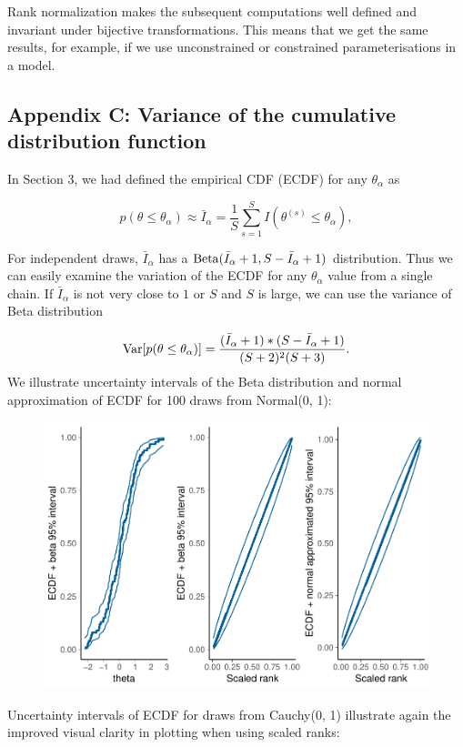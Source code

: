 \documentclass[american,]{article}
\begin{document}
Rank normalization makes the subsequent computations well defined and
invariant under bijective transformations. This means that we get the
same results, for example, if we use unconstrained or constrained
parameterisations in a model.

\hypertarget{AppendixC}{%
\subsection*{Appendix C: Variance of the cumulative distribution
function}\label{AppendixC}}

In Section 3, we had defined the empirical CDF (ECDF) for any
\(\theta_\alpha\) as

\[
p(\theta \leq \theta_\alpha) \approx \bar{I}_\alpha = \frac{1}{S}\sum_{s=1}^S
I(\theta^{(s)} \leq\theta_\alpha),
\]

For independent draws, \(\bar{I}_\alpha\) has a
\({\rm Beta}(\bar{I}_\alpha+1, S - \bar{I}_\alpha + 1)\) distribution.
Thus we can easily examine the variation of the ECDF for any
\(\theta_\alpha\) value from a single chain. If \(\bar{I}_\alpha\) is
not very close to \(1\) or \(S\) and \(S\) is large, we can use the
variance of Beta distribution

\[
{\rm Var}[p(\theta \leq \theta_\alpha)] =
\frac{(\bar{I}_\alpha+1)*(S-\bar{I}_\alpha+1)}{(S+2)^2(S+3)}.
\] We illustrate uncertainty intervals of the Beta distribution and
normal approximation of ECDF for 100 draws from Normal(0, 1):

\begin{figure}[tp]
  \centering
  \includegraphics[width=0.6\linewidth]{graphics/ranknorm-beta-1.pdf}
\end{figure}

Uncertainty intervals of ECDF for draws from Cauchy(0, 1) illustrate
again the improved visual clarity in plotting when using scaled ranks:
\end{document}
